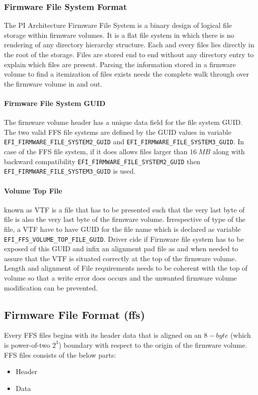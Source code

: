 \subsubsection{Firmware File System Format}
The PI Architecture Firmware File System is a binary design of logical file storage within firmware volumes. It is a flat file system in which there is no rendering of any directory hierarchy structure. Each and every files lies directly in the root of the storage. Files are stored end to end without any directory entry to explain which files are present. Parsing the information stored in a firmware volume to find a itemization of files exists needs the complete walk through over the firmware volume in and out.

\paragraph{Firmware File System GUID} The firmware volume header has a unique data field for the file system GUID. The two valid FFS file systems are defined by the GUID values in variable \verb|EFI_FIRMWARE_FILE_SYSTEM2_GUID| and \verb|EFI_FIRMWARE_FILE_SYSTEM3_GUID|. In case of the FFS file system, if it does allows files larger than $ 16 \ MB $ along with backward compatibility \verb|EFI_FIRMWARE_FILE_SYSTEM2_GUID| then \verb|EFI_FIRMWARE_FILE_SYSTEM3_GUID| is used.

\paragraph{Volume Top File} known as VTF is a file that has to be presented such that the very last byte of file is also the very last byte of the firmware volume. Irrespective of type of the file, a VTF have to have GUID for the file name which is declared as variable \verb|EFI_FFS_VOLUME_TOP_FILE_GUID|.
Driver cide if Firmware file system has to be exposed of this GUID and infix an alignment pad file as and when needed to assure that the VTF is situated correctly at the top of the firmware volume. Length and alignment of File requirements needs to be coherent with the top of volume so that a write error does occurs and the unwanted firmware volume modification can be prevented.

\subsection{Firmware File Format (\gls{ffs})}
Every FFS files begins with its header data that is aligned on an $ 8-byte $ (which is power-of-two $ 2^3 $) boundary with respect to the origin of the firmware volume. FFS files consists of the below parts:
\begin{itemize}
	\item Header
	\item Data
\end{itemize}

